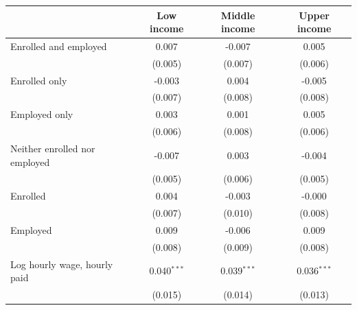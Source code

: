 \begin{tabular}{lccc}
\toprule
 & Low income & Middle income & Upper income \\
\midrule
Enrolled and employed & 0.007 & -0.007 & 0.005 \\
 & (0.005) & (0.007) & (0.006) \\
Enrolled only & -0.003 & 0.004 & -0.005 \\
 & (0.007) & (0.008) & (0.008) \\
Employed only & 0.003 & 0.001 & 0.005 \\
 & (0.006) & (0.008) & (0.006) \\
Neither enrolled nor employed & -0.007 & 0.003 & -0.004 \\
 & (0.005) & (0.006) & (0.005) \\
Enrolled & 0.004 & -0.003 & -0.000 \\
 & (0.007) & (0.010) & (0.008) \\
Employed & 0.009 & -0.006 & 0.009 \\
 & (0.008) & (0.009) & (0.008) \\
Log hourly wage, hourly paid & 0.040$^{***}$ & 0.039$^{***}$ & 0.036$^{***}$ \\
 & (0.015) & (0.014) & (0.013) \\
\bottomrule
\end{tabular}
